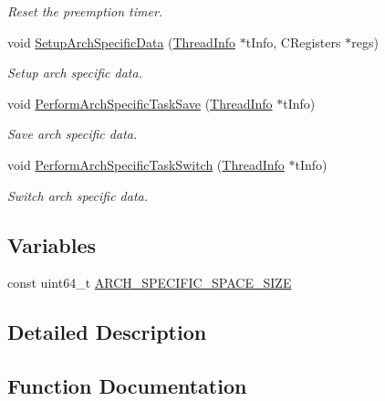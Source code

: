 \begin{DoxyCompactItemize}
\begin{DoxyCompactList}\small\item\em Reset the preemption timer. \end{DoxyCompactList}\item 
void \hyperlink{group__threading_ga650b818628a6c37e290b2696730a88cf}{Setup\+Arch\+Specific\+Data} (\hyperlink{structThreadInfo}{Thread\+Info} $\ast$t\+Info, C\+Registers $\ast$regs)
\begin{DoxyCompactList}\small\item\em Setup arch specific data. \end{DoxyCompactList}\item 
void \hyperlink{group__threading_ga66249832967a3cf4425222363b1b7b01}{Perform\+Arch\+Specific\+Task\+Save} (\hyperlink{structThreadInfo}{Thread\+Info} $\ast$t\+Info)
\begin{DoxyCompactList}\small\item\em Save arch specific data. \end{DoxyCompactList}\item 
void \hyperlink{group__threading_gab391eb54537f0736b7c9fa337d7c9afc}{Perform\+Arch\+Specific\+Task\+Switch} (\hyperlink{structThreadInfo}{Thread\+Info} $\ast$t\+Info)
\begin{DoxyCompactList}\small\item\em Switch arch specific data. \end{DoxyCompactList}\end{DoxyCompactItemize}
\subsection*{Variables}
\begin{DoxyCompactItemize}
\item 
const uint64\+\_\+t \hyperlink{group__threading_gabac505eb1d5a0bf73bf348f98597f080}{A\+R\+C\+H\+\_\+\+S\+P\+E\+C\+I\+F\+I\+C\+\_\+\+S\+P\+A\+C\+E\+\_\+\+S\+I\+ZE}
\end{DoxyCompactItemize}


\subsection{Detailed Description}


\subsection{Function Documentation}
